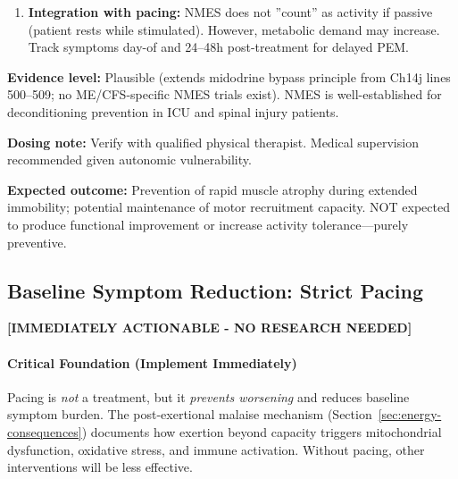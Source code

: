 \begin{recommendation}
\begin{enumerate}
    \item \textbf{Integration with pacing:} NMES does not ''count'' as activity if passive (patient rests while stimulated). However, metabolic demand may increase. Track symptoms day-of and 24--48h post-treatment for delayed PEM.
\end{enumerate}

\textbf{Evidence level:} Plausible (extends midodrine bypass principle from Ch14j lines 500--509; no ME/CFS-specific NMES trials exist). NMES is well-established for deconditioning prevention in ICU and spinal injury patients.

\textbf{Dosing note:} Verify with qualified physical therapist. Medical supervision recommended given autonomic vulnerability.

\textbf{Expected outcome:} Prevention of rapid muscle atrophy during extended immobility; potential maintenance of motor recruitment capacity. NOT expected to produce functional improvement or increase activity tolerance—purely preventive.

\end{recommendation}

\subsection{Baseline Symptom Reduction: Strict Pacing}
\label{sec:strict-pacing}

\textbf{[IMMEDIATELY ACTIONABLE - NO RESEARCH NEEDED]}

\paragraph{Critical Foundation (Implement Immediately)}

Pacing is \emph{not} a treatment, but it \emph{prevents worsening} and reduces baseline symptom burden. The post-exertional malaise mechanism (Section~\ref{sec:energy-consequences}) documents how exertion beyond capacity triggers mitochondrial dysfunction, oxidative stress, and immune activation. Without pacing, other interventions will be less effective.

